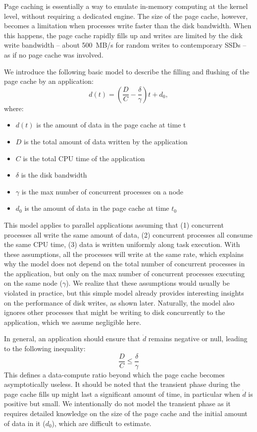 \documentclass{IEEEtran}
\begin{document}
Page caching is essentially a way to 
emulate in-memory computing at the kernel level, without requiring a 
dedicated engine. The size of the page cache, however, becomes a 
limitation when processes write faster than the disk bandwidth. When 
this happens, the page cache rapidly fills up and writes are limited by 
the disk write bandwidth -- about 500~MB/s for random writes to 
contemporary SSDs  -- as if no page cache was involved.

We introduce the following basic model to describe the filling and 
flushing of the page cache by an application:
$$
d(t) = \left( \frac{D}{C} - \frac{\delta}{\gamma} \right)t + d_0,
$$
where:
\begin{itemize}
\item $d(t)$ is the amount of data in the page cache at time t
\item $D$ is the total amount of data written by the application
\item $C$ is the total CPU time of the application
\item $\delta$ is the disk bandwidth
\item $\gamma$ is the max number of concurrent processes on a node
\item $d_0$ is the amount of data in the page cache at time $t_0$
\end{itemize}

This model applies to parallel applications assuming that (1) 
concurrent processes all write the same amount of data, (2) 
concurrent processes all consume the same CPU time, (3) data is written 
uniformly along task execution. With these assumptions, all the 
processes will write at the same rate, which explains why the model 
does not depend on the total number of concurrent processes in the 
application, but only on the max number of concurrent processes 
executing on the same node ($\gamma$). We realize that these 
assumptions would usually be violated in practice, but this simple 
model already provides interesting insights on the performance of disk 
writes, as shown later. Naturally, the model also ignores other 
processes that might be writing to disk concurrently to the 
application, which we assume negligible here. 

In general, an application should ensure that $\dot d$ remains negative 
or null, leading to the following inequality:
\begin{equation}
\frac{D}{C} \leq \frac{\delta}{\gamma} \label{eq:page-cache-inequality}
\end{equation}
This defines a data-compute ratio beyond which the page cache becomes 
asymptotically useless. It should be noted that the transient phase 
during the page cache fills up might last a significant amount of time, 
in particular when $\dot d$ is positive but small. We intentionally do not model the 
transient phase as it requires detailed knowledge on the size of the 
page cache and the initial amount 
of data in it ($d_0$), which are difficult to estimate.
\end{document}
